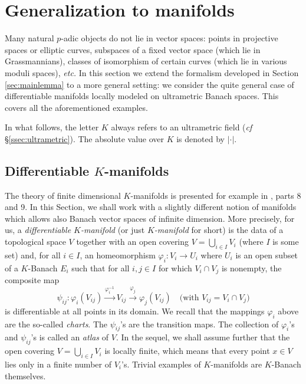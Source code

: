 \documentclass{lms}
\begin{document}
\appendix

\section{Generalization to manifolds}
\label{sec:manifold}

Many natural $p$-adic objects do not lie in vector spaces:
points in projective spaces or elliptic curves,
subspaces of a fixed vector space (which lie in Grassmannians),
classes of isomorphism of certain curves (which lie in various moduli spaces),
\emph{etc.}  In this section we extend the formalism 
developed in Section \ref{sec:mainlemma} to a more general setting:
we consider the quite general case of 
differentiable manifolds locally modeled on ultrametric Banach spaces.
This covers all the 
aforementioned examples.

In what follows, the letter $K$ always refers to an ultrametric field 
(\emph{cf} \S \ref{ssec:ultrametric}). The absolute value over $K$ is 
denoted by $|\cdot|$.

\subsection{Differentiable $K$-manifolds}
\label{ssec:manifold}

The theory of finite dimensional $K$-manifolds is presented for example 
in \cite{Schneider}, parts 8 and 9. In this Section, we shall work with
a slightly different notion of manifolds which allows also Banach vector 
spaces of infinite dimension.
More precisely, for us, a \emph{ differentiable $K$-manifold} 
(or just \emph{$K$-manifold} for short) is the data of a topological 
space $V$ together with an open covering $V = \bigcup_{i \in I} V_i$ 
(where $I$ is some set) and, for all $i \in I$, an homeomorphism 
$\varphi_i : V_i \to U_i$ where $U_i$ is an open subset of a $K$-Banach 
$E_i$ such that for all $i,j \in I$ for which $V_i \cap V_j$ is 
nonempty, the composite map
\begin{equation}
\label{eq:psiij}
\psi_{ij} : 
\varphi_i(V_{ij}) \stackrel{\varphi_i^{-1}}{\longrightarrow} 
V_{ij} \stackrel{\varphi_j}{\longrightarrow} \varphi_j(V_{ij})
\quad \text{(with } V_{ij} = V_i \cap V_j \text{)}
\end{equation}
is differentiable at all points in its domain. We recall that
the mappings $\varphi_i$ above are the so-called \emph{charts}. The
$\psi_{ij}$'s are the transition maps. The collection of $\varphi_i$'s
and $\psi_{ij}$'s is called an \emph{atlas} of $V$. In the sequel, we 
shall assume further that the open covering $V = \bigcup_{i \in I} V_i$ 
is locally finite, which means that every point $x \in V$ lies only in a 
finite number of $V_i$'s. Trivial examples of $K$-manifolds are 
$K$-Banach themselves.
\end{document}
